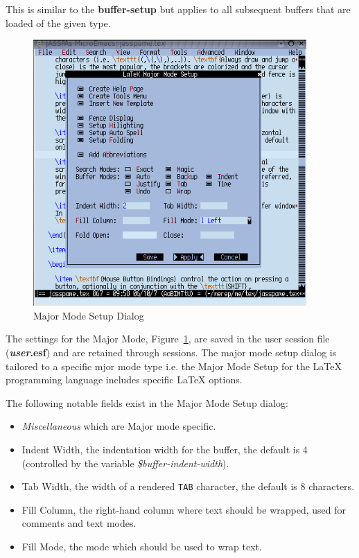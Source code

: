\documentclass[11pt,a4paper,pdftex]{article}
\begin{document}
  This is similar to the \textbf{buffer-setup} but applies to all subsequent
  buffers that are loaded of the given type.

\begin{figure}[!hbt]
  \begin{center}
    \includegraphics[keepaspectratio,height=4in]{majormodesetup}
    \caption{Major Mode Setup Dialog}
    \label{fig:majormodesetup}
  \end{center}
\end{figure}
  
  The settings for the Major Mode, Figure~\ref{fig:majormodesetup}, are saved
  in the user session file (\textbf{\textit{user}.esf}) and are retained
  through sessions. The major mode setup dialog is tailored to a specific mjor
  mode type i.e. the Major Mode Setup for the LaTeX programming language
  includes specific LaTeX options. 
  
  The following notable fields exist in the Major Mode Setup dialog:
  
  \begin{itemize}
    
    \item \textit{Miscellaneous} which are Major mode specific.
     
    \item Indent Width, the indentation width for the buffer, the default is 4
    (controlled by the variable \textit{\$buffer-indent-width}).

    \item Tab Width, the width of a rendered \texttt{TAB} character, the
    default is 8 characters.

    \item Fill Column, the right-hand column where text should be wrapped,
    used for comments and text modes.

    \item Fill Mode, the mode which should be used to wrap text.
    
  \end{itemize}
\end{document}
